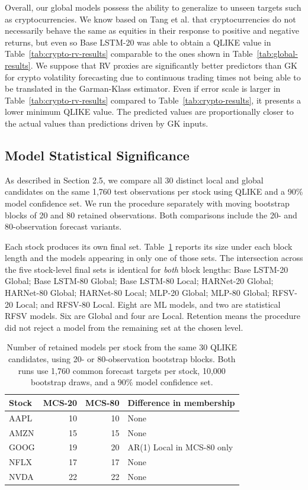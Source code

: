 \documentclass[12pt,a4paper]{article}
\numberwithin{equation}{section}
\numberwithin{table}{section}
\numberwithin{figure}{section}
\begin{document}
Overall, our global models possess the ability to generalize to unseen targets such as cryptocurrencies. We know based on Tang et al. \cite{tang2023} that cryptocurrencies do not necessarily behave the same as equities in their response to positive and negative returns, but even so Base LSTM-20 was able to obtain a QLIKE value in Table~\ref{tab:crypto-rv-results} comparable to the ones shown in Table~\ref{tab:global-results}. We suppose that RV proxies are significantly better predictors than GK for crypto volatility forecasting due to continuous trading times not being able to be translated in the Garman-Klass estimator. Even if error scale is larger in Table~\ref{tab:crypto-rv-results} compared to Table~\ref{tab:crypto-results}, it presents a lower minimum QLIKE value. The predicted values are proportionally closer to the actual values than predictions driven by GK inputs. 


\subsection{Model Statistical Significance}
As described in Section 2.5, we compare all 30 distinct local and global candidates on the same 1,760 test observations per stock using QLIKE and a 90\% model confidence set. We run the procedure separately with moving bootstrap blocks of 20 and 80 retained observations. Both comparisons include the 20- and 80-observation forecast variants. 

Each stock produces its own final set. Table~\ref{tab:mcs-cross-window} reports its size under each block length and the models appearing in only one of those sets. The intersection across the five stock-level final sets is identical for \emph{both} block lengths: Base LSTM-20 Global; Base LSTM-80 Global; Base LSTM-80 Local; HARNet-20 Global; HARNet-80 Global; HARNet-80 Local; MLP-20 Global; MLP-80 Global; RFSV-20 Local; and RFSV-80 Local. Eight are ML models, and two are statistical RFSV models. Six are Global and four are Local. Retention means the procedure did not reject a model from the remaining set at the chosen level. 
\begin{table}[htbp]
\centering
\begin{tabular}{lrrl}\hline
Stock & MCS-20 & MCS-80 & Difference in membership\\\hline
AAPL & 10 & 10 & None\\
AMZN & 15 & 15 & None\\
GOOG & 19 & 20 & AR(1) Local in MCS-80 only\\
NFLX & 17 & 17 & None\\
NVDA & 22 & 22 & None\\\hline
\end{tabular}
\caption{Number of retained models per stock from the same 30 QLIKE candidates, using 20- or 80-observation bootstrap blocks. Both runs use 1,760 common forecast targets per stock, 10,000 bootstrap draws, and a 90\% model confidence set.}\label{tab:mcs-cross-window}
\end{table}
\FloatBarrier 
\end{document}
